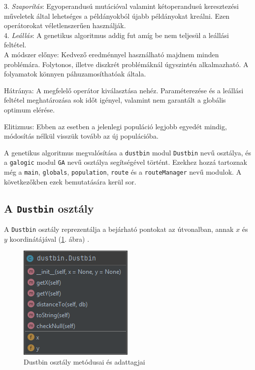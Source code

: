 3. \textit{Szaporítás}: Egyoperandusú mutációval valamint kétoperandusú keresztezési mű\-veletek által lehetséges a példányokból újabb példányokat kreálni. Ezen operátorokat véletlenszerűen használják. \\

4. \textit{Leállás}: A genetikus algoritmus addig fut amíg be nem teljesül a leállási feltétel.\\

A módszer előnye: Kedvező eredménnyel használható majdnem minden problémára. Folytonos, illetve diszkrét problémáknál úgyszintén alkalmazható. A folyamatok könnyen páhuzamosíthatóak általa.

Hátránya: A megfelelő operátor kiválasztása nehéz. Paraméterezése és a leállási feltétel meghatározása sok időt igényel, valamint nem garantált a globális optimum elérése.

Elitizmus: Ebben az esetben a jelenlegi populáció legjobb egyedét mindig, módosítás nélkül visszük tovább az új populációba.


A genetikus algoritmus megvalósítása a \texttt{dustbin} modul \texttt{Dustbin} nevű osztálya, és a \texttt{galogic} modul \texttt{GA} nevű osztálya segítségével történt.
Ezekhez hozzá tartoznak még a \texttt{main}, \texttt{globals}, \texttt{population}, \texttt{route} és a \texttt{routeManager} nevű modulok.
A következőkben ezek bemutatására kerül sor.

\subsection{A \texttt{Dustbin} osztály}

A \texttt{Dustbin} osztály reprezentálja a bejárható pontokat az útvonalban, annak $x$ és $y$ koordinátájával (\ref{fig:dustbin}. ábra) \cite{Python}.

\begin{figure}[!htb]
\centering
\includegraphics[scale=0.7]{images/dustbin.png}
\caption{Dustbin osztály metódusai és adattagjai}
\label{fig:dustbin}
\end{figure}


